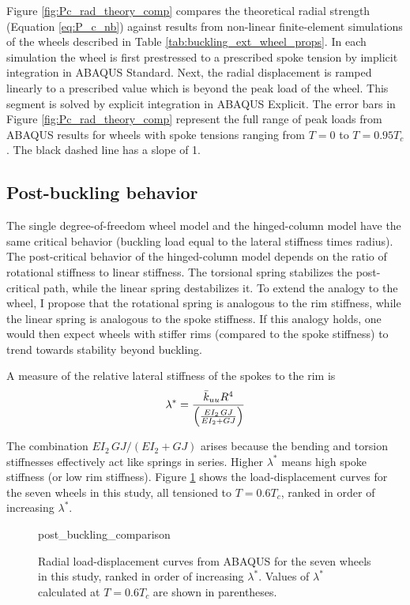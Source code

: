 \documentclass[\rootdir/thesis.tex]{subfiles}
\begin{document}
Figure \ref{fig:Pc_rad_theory_comp} compares the theoretical radial strength (Equation \eqref{eq:P_c_nb}) against results from non-linear finite-element simulations of the wheels described in Table \ref{tab:buckling_ext_wheel_props}. In each simulation the wheel is first prestressed to a prescribed spoke tension by implicit integration in ABAQUS Standard. Next, the radial displacement is ramped linearly to a prescribed value which is beyond the peak load of the wheel. This segment is solved by explicit integration in ABAQUS Explicit. The error bars in Figure \ref{fig:Pc_rad_theory_comp} represent the full range of peak loads from ABAQUS results for wheels with spoke tensions ranging from $T=0$ to $T=0.95T_c$. The black dashed line has a slope of 1.

\subsection{Post-buckling behavior}

The single degree-of-freedom wheel model and the hinged-column model have the same critical behavior (buckling load equal to the lateral stiffness times radius). The post-critical behavior of the hinged-column model depends on the ratio of rotational stiffness to linear stiffness. The torsional spring stabilizes the post-critical path, while the linear spring destabilizes it. To extend the analogy to the wheel, I propose that the rotational spring is analogous to the rim stiffness, while the linear spring is analogous to the spoke stiffness. If this analogy holds, one would then expect wheels with stiffer rims (compared to the spoke stiffness) to trend towards stability beyond buckling.

A measure of the relative lateral stiffness of the spokes to the rim is
\begin{equation}
\lambda^* = \frac{\bar{k}_{uu} R^4}{\left(\frac{EI_2\,GJ}{EI_2+GJ}\right)}
\end{equation}

The combination $EI_2\,GJ/(EI_2+GJ)$ arises because the bending and torsion stiffnesses effectively act like springs in series. Higher $\lambda^*$ means high spoke stiffness (or low rim stiffness). Figure \ref{fig:post_buckling_comparison} shows the load-displacement curves for the seven wheels in this study, all tensioned to $T=0.6T_c$, ranked in order of increasing $\lambda^*$.

\begin{figure}[h]
\centering
{post_buckling_comparison}
\caption{Radial load-displacement curves from ABAQUS for the seven wheels in this study, ranked in order of increasing $\lambda^*$. Values of $\lambda^*$ calculated at $T=0.6T_c$ are shown in parentheses.}
\label{fig:post_buckling_comparison}
\end{figure}
\end{document}
